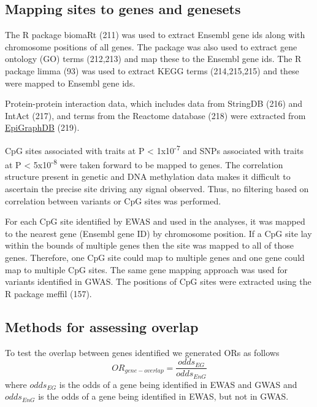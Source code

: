 \documentclass[11pt,oneside]{bristolthesis}
\begin{document}
\hypertarget{mapping-sites-to-genes-and-genesets}{%
\subsection{Mapping sites to genes and genesets}\label{mapping-sites-to-genes-and-genesets}}

The R package biomaRt (211) was used to extract Ensembl gene ids along with chromosome positions of all genes. The package was also used to extract gene ontology (GO) terms (212,213) and map these to the Ensembl gene ids. The R package limma (93) was used to extract KEGG terms (214,215,215) and these were mapped to Ensembl gene ids.

Protein-protein interaction data, which includes data from StringDB (216) and IntAct (217), and terms from the Reactome database (218) were extracted from \href{http://www.epigraphdb.org/}{EpiGraphDB} (219).

CpG sites associated with traits at P \textless{} 1x10\textsuperscript{-7} and SNPs associated with traits at P \textless{} 5x10\textsuperscript{-8} were taken forward to be mapped to genes. The correlation structure present in genetic and DNA methylation data makes it difficult to ascertain the precise site driving any signal observed. Thus, no filtering based on correlation between variants or CpG sites was performed.

For each CpG site identified by EWAS and used in the analyses, it was mapped to the nearest gene (Ensembl gene ID) by chromosome position. If a CpG site lay within the bounds of multiple genes then the site was mapped to all of those genes. Therefore, one CpG site could map to multiple genes and one gene could map to multiple CpG sites. The same gene mapping approach was used for variants identified in GWAS. The positions of CpG sites were extracted using the R package meffil (157).

\hypertarget{methods-for-assessing-overlap}{%
\subsection{Methods for assessing overlap}\label{methods-for-assessing-overlap}}

To test the overlap between genes identified we generated ORs as follows
\begin{equation}
    OR_{gene-overlap} = \frac{odds_{EG}} {odds_{EnG}}
    \label{eq:overlap-of-genes}
\end{equation}
where \(odds_{EG}\) is the odds of a gene being identified in EWAS and GWAS and \(odds_{EnG}\) is the odds of a gene being identified in EWAS, but not in GWAS.
\end{document}
